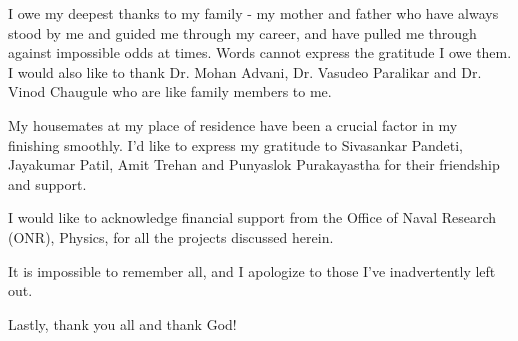I owe my deepest thanks to my family - my mother and father who have always stood by me and guided me through my career, and have pulled me through against impossible odds at times. Words cannot express the gratitude I owe them. I would also like to thank Dr. Mohan Advani, Dr. Vasudeo Paralikar and Dr. Vinod Chaugule who are like family members to me.

My housemates at my place of residence have been a crucial factor in my finishing smoothly. I'd like to express my gratitude to Sivasankar Pandeti, Jayakumar Patil, Amit Trehan and Punyaslok Purakayastha for their friendship and support.

I would like to acknowledge financial support from the Office of Naval Research (ONR), Physics, for all the projects discussed herein.

It is impossible to remember all, and I apologize to those I've inadvertently left out.

Lastly, thank you all and thank God!
